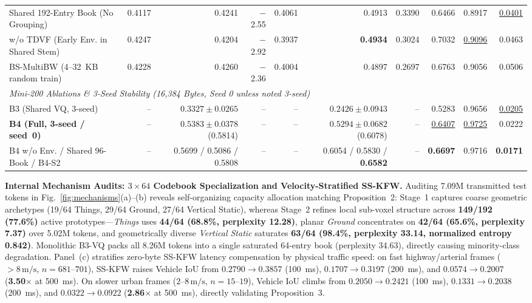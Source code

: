 \documentclass[journal]{IEEEtran}
\begin{document}
\begin{table}[!tbp]
{\begin{tabular}{lrrrrrrrrr}
Shared 192-Entry Book (No Grouping) & 0.4117 & 0.4241 & $-$2.55 & 0.4061 & 0.4913 & 0.3390 & 0.6466 & 0.8917 & \underline{0.0401} \\
w/o TDVF (Early Env. in Shared Stem) & 0.4247 & 0.4204 & $-$2.92 & 0.3937 & \textbf{0.4934} & 0.3024 & 0.7032 & \underline{0.9096} & 0.0463 \\
\midrule
BS-MultiBW (4--32~KB random train) & 0.4228 & 0.4260 & $-$2.36 & 0.4004 & 0.4897 & 0.2697 & 0.6763 & 0.9056 & 0.0506 \\
\midrule
\multicolumn{10}{l}{\textit{Mini-200 Ablations \& 3-Seed Stability (16,384 Bytes, Seed 0 unless noted 3-seed)}} \\
B3 (Shared VQ, 3-seed) & -- & $0.3327 \pm 0.0265$ & -- & -- & $0.2426 \pm 0.0943$ & -- & 0.5283 & 0.9656 & \underline{0.0205} \\
\rowcolor{oursrow}
\textbf{B4 (Full, 3-seed / seed~0)} & -- & {\boldmath$0.5383 \pm 0.0378$} (0.5814) & -- & -- & \underline{$0.5294 \pm 0.0682$} (0.6078) & -- & \underline{0.6407} & \underline{0.9725} & 0.0222 \\
B4 w/o Env. / Shared 96-Book / B4-S2 & -- & 0.5699 / 0.5086 / 0.5808 & -- & -- & 0.6054 / 0.5830 / \textbf{0.6582} & -- & \textbf{0.6697} & 0.9716 & \textbf{0.0171} \\
\bottomrule
\end{tabular}}
\end{table}

\textbf{Internal Mechanism Audits: $3\times 64$ Codebook Specialization and Velocity-Stratified SS-KFW.} Auditing 7.09M transmitted test tokens in Fig.~\ref{fig:mechanisms}(a)--(b) reveals self-organizing capacity allocation matching Proposition~2: Stage~1 captures coarse geometric archetypes (19/64 Things, 29/64 Ground, 27/64 Vertical Static), whereas Stage~2 refines local sub-voxel structure across \textbf{149/192 (77.6\%)} active prototypes---\textit{Things} uses \textbf{44/64 (68.8\%, perplexity 12.28)}, planar \textit{Ground} concentrates on \textbf{42/64 (65.6\%, perplexity 7.37)} over 5.02M tokens, and geometrically diverse \textit{Vertical Static} saturates \textbf{63/64 (98.4\%, perplexity 33.14, normalized entropy 0.842)}. Monolithic B3-VQ packs all 8.26M tokens into a single saturated 64-entry book (perplexity 34.63), directly causing minority-class degradation. Panel~(c) stratifies zero-byte SS-KFW latency compensation by physical traffic speed: on fast highway/arterial frames ($>8\,\mathrm{m/s}$, $n=681$--$701$), SS-KFW raises Vehicle IoU from $0.2790 \to \mathbf{0.3857}$ (100~ms), $0.1707 \to \mathbf{0.3197}$ (200~ms), and $0.0574 \to \mathbf{0.2007}$ (\textbf{3.50$\times$} at 500~ms). On slower urban frames ($2$--$8\,\mathrm{m/s}$, $n=15$--$19$), Vehicle IoU climbs from $0.2050 \to \mathbf{0.2421}$ (100~ms), $0.1331 \to \mathbf{0.2038}$ (200~ms), and $0.0322 \to \mathbf{0.0922}$ (\textbf{2.86$\times$} at 500~ms), directly validating Proposition~3.
\end{document}
